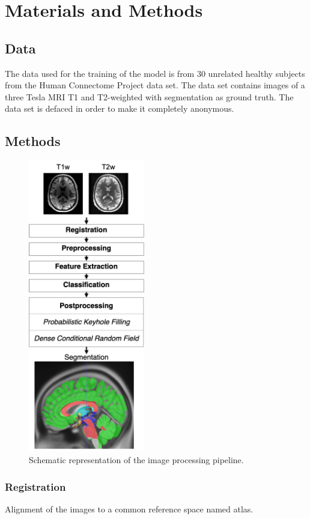 \documentclass[journal]{IEEEtran}
\begin{document}
\section{Materials and Methods}
\subsection{Data}
The data used for the training of the model is from 30 unrelated healthy subjects from the Human Connectome Project data set. The data set contains images of a three Tesla MRI T1 and T2-weighted with segmentation as ground truth. The data set is defaced in order to make it  completely anonymous.
\subsection{Methods}
\begin{figure}[h!]
\centering
\includegraphics[width=2in]{img/pipeline}
\caption{Schematic representation of the image processing pipeline.}
\label{fig_pipeline}
\end{figure}


\subsubsection{Registration}

Alignment of the images to a common reference space named atlas.
\end{document}
